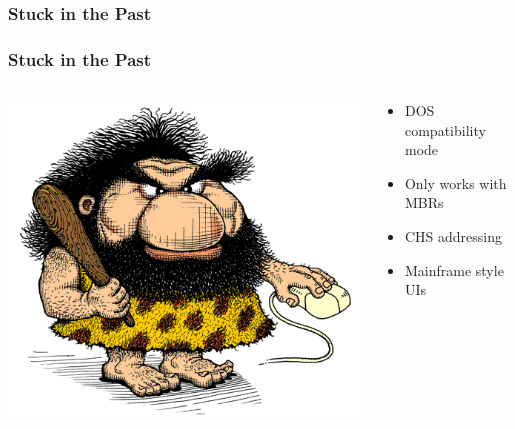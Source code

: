 \documentclass{beamer}
\begin{document}
\subsubsection{Stuck in the Past}
\begin{frame}\frametitle{Stuck in the Past}
  \begin{columns}
    \begin{column}{.5\linewidth}
      \includegraphics[scale=0.3]{img/linkman}
       \end{column}
    \begin{column}{.5\linewidth}
      \begin{itemize}
      \item DOS compatibility mode
      \item Only works with MBRs
      \item CHS addressing
      \item Mainframe style UIs\newline
      \end{itemize}
    \end{column}
  \end{columns}
\end{frame}
\end{document}
